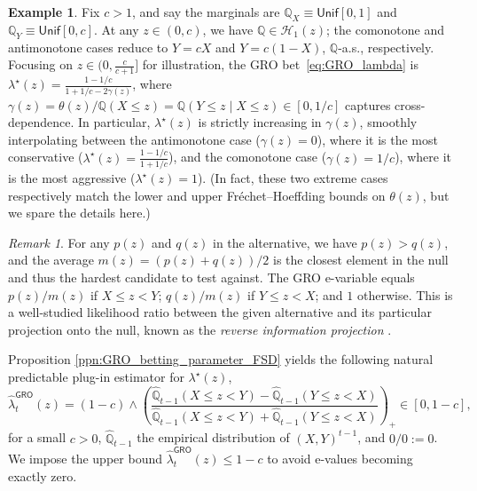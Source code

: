\documentclass[12pt,twoside]{article}
\theoremstyle{plain}
\theoremstyle{definition}
\newtheorem{example}{Example}
\theoremstyle{remark}
\newtheorem{remark}{Remark}
\newcommand{\Qsymb}{\mathbb{Q}}
\begin{document}
\begin{example}
    Fix $c > 1$, and say the marginals are $\Qsymb_X \equiv \mathsf{Unif}[0,1]$ and $\Qsymb_Y \equiv \mathsf{Unif}[0, c]$. 
    At any $z \in (0, c)$, we have $\Qsymb \in \mathcal{H}_1(z)$; the comonotone and antimonotone cases reduce to $Y = cX$ and $Y = c(1-X)$, $\Qsymb$-a.s., respectively.
    Focusing on $z \in (0,\frac{c}{c+1}]$ for illustration, the GRO bet~\eqref{eq:GRO_lambda} is $\lambda^\star(z) = \frac{1-1/c}{1 + 1/c - 2\gamma(z)}$, where $\gamma(z) = \theta(z)/\Qsymb(X \leq z) = \Qsymb(Y \leq z \mid X \leq z) \in [0, 1/c]$ captures cross-dependence. 
    In particular, $\lambda^\star(z)$ is strictly increasing in $\gamma(z)$, smoothly interpolating between the antimonotone case ($\gamma(z)=0$), where it is the most conservative ($\lambda^\star(z) = \frac{1-1/c}{1+1/c}$), and the comonotone case ($\gamma(z)=1/c$), where it is the most aggressive ($\lambda^\star(z) = 1$). 
    (In fact, these two extreme cases respectively match the lower and upper Fr\'echet--Hoeffding bounds on $\theta(z)$, but we spare the details here.)
\end{example}

\begin{remark} 
For any $p(z)$ and $q(z)$ in the alternative, we have $p(z)>q(z)$, and the average $m(z)=(p(z)+q(z))/2$ is the closest element in the null and thus the hardest candidate to test against. 
The GRO e-variable equals $p(z)/m(z)$ if $X \leq z < Y$; $q(z)/m(z)$ if $Y \leq z < X$; and $1$ otherwise. 
This is a well-studied likelihood ratio between the given alternative and its particular projection onto the null, known as the \emph{reverse information projection} \citep{grunwald2019safe,larsson2025numeraire}.
\end{remark}

Proposition \ref{ppn:GRO_betting_parameter_FSD} yields the following natural predictable plug-in estimator for $\lambda^\star(z)$, 
\begin{equation}\label{eq:plugin_GRO_lambda}
    \hat{\lambda}_t^\textsf{GRO}(z)
    = (1-c) \land\left(\frac{\hat{\mathbb{Q}}_{t-1}(X \leq z < Y)-\hat{\mathbb{Q}}_{t-1}(Y \leq z < X)}{\hat{\mathbb{Q}}_{t-1}(X \leq z < Y)+\hat{\mathbb{Q}}_{t-1}(Y \leq z < X)}\right)_+ \in [0,1-c],
\end{equation}
for a small $c>0$, $\hat{\mathbb{Q}}_{t-1}$ the empirical distribution of $(X,Y)^{t-1}$, and $0/0:=0$. We impose the upper bound $ \hat{\lambda}_t^\textsf{GRO}(z) \leq 1-c$ to avoid e-values becoming exactly zero. 
\end{document}
